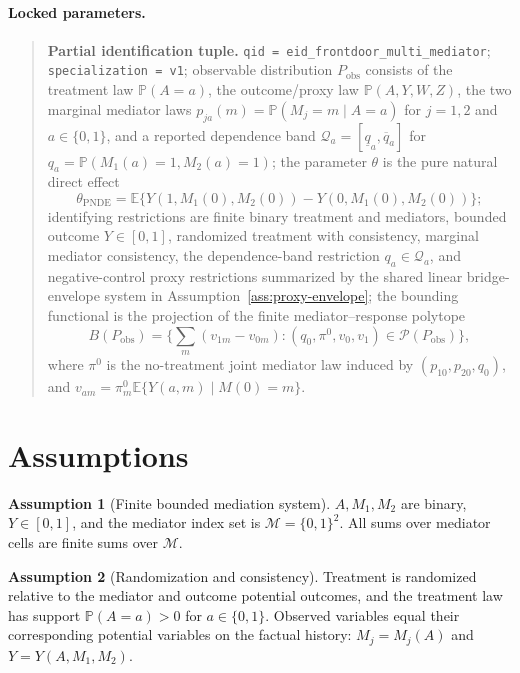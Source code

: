 \documentclass[11pt]{article}
\newcommand{\E}{\mathbb{E}}
\renewcommand{\Pr}{\mathbb{P}}
\theoremstyle{definition}
\newtheorem{assumption}{Assumption}
\theoremstyle{plain}
\theoremstyle{remark}
\begin{document}
\paragraph{Locked parameters.}
\begin{quote}
\textbf{Partial identification tuple.}
\texttt{qid = eid\_frontdoor\_multi\_mediator};
\texttt{specialization = v1};
observable distribution \(P_{\mathrm{obs}}\) consists of the treatment law
\(\Pr(A=a)\), the outcome/proxy law \(\Pr(A,Y,W,Z)\), the two marginal
mediator laws \(p_{ja}(m)=\Pr(M_j=m\mid A=a)\) for \(j=1,2\) and
\(a\in\{0,1\}\), and a reported dependence band
\(\mathcal Q_a=[\underline q_a,\overline q_a]\) for
\(q_a=\Pr(M_1(a)=1,M_2(a)=1)\);
the parameter \(\theta\) is the pure natural direct effect
\[
  \theta_{\mathrm{PNDE}}
  = \E\{Y(1,M_1(0),M_2(0))-Y(0,M_1(0),M_2(0))\};
\]
identifying restrictions are finite binary treatment and mediators, bounded
outcome \(Y\in[0,1]\), randomized treatment with consistency, marginal
mediator consistency, the dependence-band restriction \(q_a\in\mathcal Q_a\),
and negative-control proxy restrictions summarized by the shared linear
bridge-envelope system in Assumption~\ref{ass:proxy-envelope};
the bounding functional is the projection of the finite mediator--response
polytope
\[
  B(P_{\mathrm{obs}})
  = \{\sum_m(v_{1m}-v_{0m}) :
       (q_0,\pi^0,v_0,v_1)\in\mathcal P(P_{\mathrm{obs}})\},
\]
where \(\pi^0\) is the no-treatment joint mediator law induced by
\((p_{10},p_{20},q_0)\), and \(v_{am}=\pi^0_m\E\{Y(a,m)\mid M(0)=m\}\).
\end{quote}

\section{Assumptions}
\begin{assumption}[Finite bounded mediation system]\label{ass:finite-bounded}
\(A,M_1,M_2\) are binary, \(Y\in[0,1]\), and the mediator index set is
\(\mathcal M=\{0,1\}^2\).  All sums over mediator cells are finite sums over
\(\mathcal M\).
\end{assumption}

\begin{assumption}[Randomization and consistency]\label{ass:randomization-consistency}
Treatment is randomized relative to the mediator and outcome potential
outcomes, and the treatment law has support \(\Pr(A=a)>0\) for
\(a\in\{0,1\}\).  Observed variables equal their corresponding potential
variables on the factual history: \(M_j=M_j(A)\) and \(Y=Y(A,M_1,M_2)\).
\end{assumption}
\end{document}

